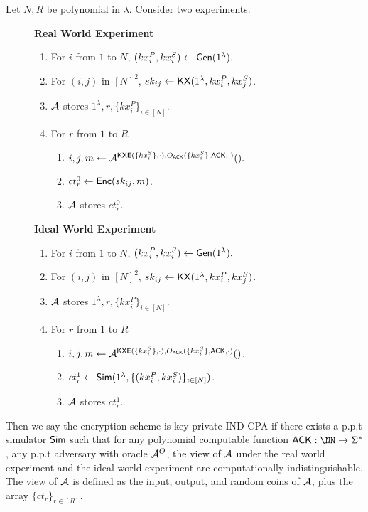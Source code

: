 \begin{definition}
\label{defn:sym-security}
Let $N, R$ be polynomial in $\lambda$. Consider two experiments.
\begin{figure}[h!]
\begin{framed}
\textbf{Real World Experiment}
\begin{enumerate}
    \item For $i$ from $1$ to $N$, $(kx_i^P, kx_i^S) \leftarrow \mathsf{Gen}(1^{\lambda}).$
    \item For $(i, j)$ in $[N]^2$, $sk_{ij} \leftarrow \mathsf{KX}(1^{\lambda}, kx_i^P, kx_j^S)$.
    \item $\mathcal{A}$ stores $1^{\lambda}, r, \{kx_i^P\}_{i \in [N]}$.
    \item For $r$ from $1$ to $R$
    \begin{enumerate}
        \item $i, j, m \leftarrow \mathcal{A}^{\mathsf{KXE}(\{kx_i^S\}, \cdot), O_{\mathsf{ACK}}(\{kx_i^S\}, \mathsf{ACK}, \cdot)}().$
        \item $ct^{0}_r \leftarrow \mathsf{Enc}(sk_{ij}, m)$.
        \item $\mathcal{A}$ stores $ct^{0}_r$.
    \end{enumerate}
\end{enumerate}
\textbf{Ideal World Experiment}
\begin{enumerate}
    \item For $i$ from $1$ to $N$, $(kx_i^P, kx_i^S) \leftarrow \mathsf{Gen}(1^{\lambda}).$
    \item For $(i, j)$ in $[N]^2$, $sk_{ij} \leftarrow \mathsf{KX}(1^{\lambda}, kx_i^P, kx_j^S)$.
    \item $\mathcal{A}$ stores $1^{\lambda}, r, \{kx_i^P\}_{i \in [N]}$.
    \item For $r$ from $1$ to $R$
    \begin{enumerate}
        \item $i, j, m \leftarrow \mathcal{A}^{\mathsf{KXE}(\{kx_i^S\}, \cdot), O_{\mathsf{ACK}}(\{kx_i^S\}, \mathsf{ACK}, \cdot)}()$.
        \item $ct^1_r \leftarrow \mathsf{Sim}(1^{\lambda}, \{(kx_i^P, kx_i^S)\}_{i \in [N]})$.
        \item $\mathcal{A}$ stores $ct^{1}_r$.
    \end{enumerate}
\end{enumerate}
\end{framed}
\end{figure}

Then we say the encryption scheme is key-private IND-CPA if there exists a p.p.t simulator $\mathsf{Sim}$ such that for any polynomial computable function $\ACK: \NN \to \Sigma^*$, any p.p.t adversary with oracle $\mathcal{A}^O$, the view of $\mathcal{A}$ under the real world experiment and the ideal world experiment are computationally indistinguishable. The view of $\mathcal{A}$ is defined as the input, output, and random coins of $\mathcal{A}$, plus the array $\{ct_r\}_{r \in [R]}$.
\end{definition}
